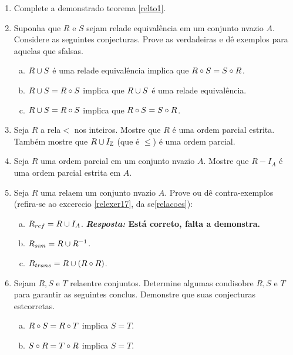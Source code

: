 \begin{enumerate}[{\bf 1.}]
\begin{enumerate}[a)]
\item $\Ima(R)\subseteq \Dom(S)$ implica $\Dom(S\bola R)=\Dom(R)$. A rec\ih proca \'e verdadeira? 
\end{enumerate}

\item Complete a demonstra\cao do teorema \ref{relto1}.

\item Suponha que $R$ e $S$ sejam rela\coes de equival\^encia em um conjunto n\ao vazio $A$. Considere as seguintes conjecturas. Prove as verdadeiras e d\^e exemplos para aquelas que s\ao falsas. 
\begin{enumerate}[a)]
\item $R\cup S$ \'e uma rela\cao de equival\^encia implica que $R\circ S=S\circ R$.
\item $R\cup S= R\circ S$ implica que $R\cup S$ \'e uma rela\cao de equival\^encia.
\item $R\cup S= R\circ S$ implica que $R\circ S=S\circ R$.
\end{enumerate}

\item Seja $R$ a rela\cao $<$ nos inteiros. Mostre que $R$ \'e uma ordem parcial estrita. Tamb\'em mostre que $R\cup I_{\mathbb{Z}}$ (que \'e $\leq$) \'e uma ordem parcial.

\item Seja $R$ uma ordem parcial em um conjunto n\ao vazio $A$. Mostre que $R-I_A$ \'e uma ordem parcial estrita em $A$.

\item Seja $R$ uma rela\cao em um conjunto n\ao vazio $A$. Prove ou d\^e contra-exemplos (refira-se ao excerc\ih cio \ref{relexer17}, da se\cao \ref{relacoes}):
\begin{enumerate}[a)]
\item $R_{ref}=R\cup I_A$. {\bf{\it Resposta:} Est\'a correto, falta a demonstra\caoi.}
\item $R_{sim}=R\cup R^{-1}$.
\item $R_{trans}=R\cup (R\circ R)$.
\end{enumerate}

\item Sejam $R,S$ e $T$ rela\coes entre conjuntos. Determine algumas condi\coes sobre $R,S$ e $T$ para garantir as seguintes conclus\ois. Demonstre que suas conjecturas est\ao corretas.
\begin{enumerate}[a)]
\item $R\circ S=R\circ T$ implica $S=T$.
\item $S\circ R=T\circ R$ implica $S=T$.
\end{enumerate}


\end{enumerate}
